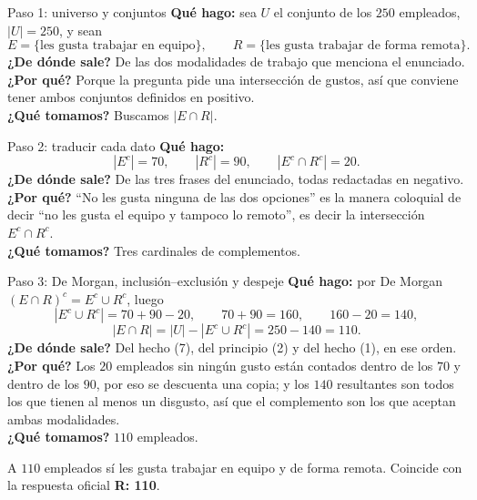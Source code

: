 \documentclass[11pt]{article}
\begin{document}
\begin{sol}

\begin{paso}{Paso 1: universo y conjuntos}
\textbf{Qu\'e hago:} sea $U$ el conjunto de los $250$ empleados, $|U|=250$, y sean
\[
E=\{\text{les gusta trabajar en equipo}\},\qquad R=\{\text{les gusta trabajar de forma remota}\}.
\]
\textbf{¿De d\'onde sale?} De las dos modalidades de trabajo que menciona el enunciado.\\
\textbf{¿Por qu\'e?} Porque la pregunta pide una intersecci\'on de gustos, as\'i que conviene tener ambos conjuntos definidos en positivo.\\
\textbf{¿Qu\'e tomamos?} Buscamos $|E\cap R|$.
\end{paso}

\begin{paso}{Paso 2: traducir cada dato}
\textbf{Qu\'e hago:}
\[
|E^{c}| = 70,\qquad |R^{c}| = 90,\qquad |E^{c}\cap R^{c}| = 20 .
\]
\textbf{¿De d\'onde sale?} De las tres frases del enunciado, todas redactadas en negativo.\\
\textbf{¿Por qu\'e?} ``No les gusta ninguna de las dos opciones'' es la manera coloquial de decir ``no les gusta el equipo y tampoco lo remoto'', es decir la intersecci\'on $E^{c}\cap R^{c}$.\\
\textbf{¿Qu\'e tomamos?} Tres cardinales de complementos.
\end{paso}

\begin{paso}{Paso 3: De Morgan, inclusi\'on--exclusi\'on y despeje}
\textbf{Qu\'e hago:} por De Morgan $(E\cap R)^{c}=E^{c}\cup R^{c}$, luego
\[
|E^{c}\cup R^{c}| = 70 + 90 - 20, \qquad 70+90 = 160, \qquad 160-20 = 140 ,
\]
\[
|E\cap R| = |U| - |E^{c}\cup R^{c}| = 250 - 140 = 110 .
\]
\textbf{¿De d\'onde sale?} Del hecho (7), del principio (2) y del hecho (1), en ese orden.\\
\textbf{¿Por qu\'e?} Los $20$ empleados sin ning\'un gusto est\'an contados dentro de los $70$ y dentro de los $90$, por eso se descuenta una copia; y los $140$ resultantes son todos los que tienen al menos un disgusto, as\'i que el complemento son los que aceptan ambas modalidades.\\
\textbf{¿Qu\'e tomamos?} $110$ empleados.
\end{paso}

\end{sol}

\begin{resp}
A $\boxed{110}$ empleados s\'i les gusta trabajar en equipo y de forma remota. Coincide con la respuesta oficial \textbf{R: 110}.
\end{resp}
\end{document}

